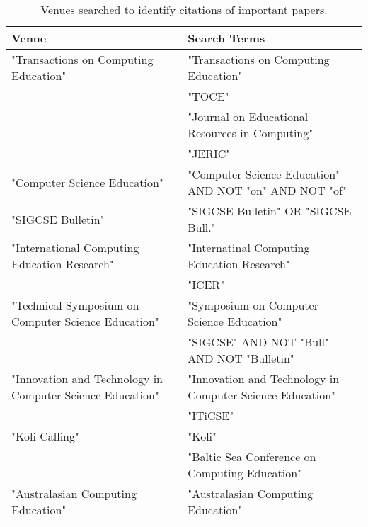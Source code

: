 \begin{table*}[t]
\begin{tabular}{ll}
Venue & Search Terms\\\hline
"Transactions on Computing Education" & "Transactions on Computing Education"\\
& "TOCE"\\
& "Journal on Educational Resources in Computing"\\
& "JERIC"\\
"Computer Science Education" & "Computer Science Education" AND NOT "on" AND NOT "of"\\
"SIGCSE Bulletin" & "SIGCSE Bulletin" OR "SIGCSE Bull."\\
"International Computing Education Research" & "Internatinal Computing Education Research"\\
& "ICER"\\
"Technical Symposium on Computer Science Education" & "Symposium on Computer Science Education"\\
& "SIGCSE" AND NOT "Bull" AND NOT "Bulletin"\\
"Innovation and Technology in Computer Science Education" & "Innovation and Technology in Computer Science Education"\\
& "ITiCSE"\\
"Koli Calling" & "Koli"\\
& "Baltic Sea Conference on Computing Education"\\
"Australasian Computing Education" & "Australasian Computing Education"
\end{tabular}
\caption{Venues searched to identify citations of important papers.}
\end{table*}